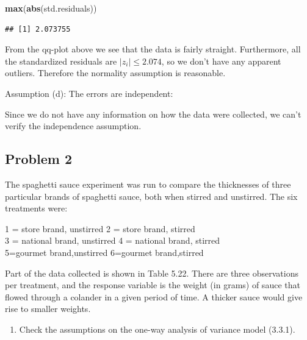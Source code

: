 \documentclass[12pt,]{article}
\newenvironment{Shaded}{\begin{snugshade}}{\end{snugshade}}
\newcommand{\KeywordTok}[1]{\textcolor[rgb]{0.13,0.29,0.53}{\textbf{#1}}}
\newcommand{\NormalTok}[1]{#1}
\providecommand{\tightlist}{%
  \setlength{\itemsep}{0pt}\setlength{\parskip}{0pt}}
\begin{document}
\begin{Shaded}
\begin{Highlighting}[]
\KeywordTok{max}\NormalTok{(}\KeywordTok{abs}\NormalTok{(std.residuals))}
\end{Highlighting}
\end{Shaded}

\begin{verbatim}
## [1] 2.073755
\end{verbatim}

From the qq-plot above we see that the data is fairly straight.
Furthermore, all the standardized residuals are \(|z_i| \leq 2.074\), so
we don't have any apparent outliers. Therefore the normality assumption
is reasonable.

Assumption (d): The errors are independent:

Since we do not have any information on how the data were collected, we
can't verify the independence assumption.

\subsection{Problem 2}\label{problem-2}

The spaghetti sauce experiment was run to compare the thicknesses of
three particular brands of spaghetti sauce, both when stirred and
unstirred. The six treatments were:

\begin{center}
1 = store brand, unstirred 2 = store brand, stirred\\
3 = national brand, unstirred 4 = national brand, stirred \\ 
5=gourmet brand,unstirred 6=gourmet brand,stirred
\end{center}

Part of the data collected is shown in Table 5.22. There are three
observations per treatment, and the response variable is the weight (in
grams) of sauce that flowed through a colander in a given period of
time. A thicker sauce would give rise to smaller weights.

\begin{enumerate}
\def\labelenumi{(\alph{enumi})}
\tightlist
\item
  Check the assumptions on the one-way analysis of variance model
  (3.3.1).
\end{enumerate}
\end{document}
